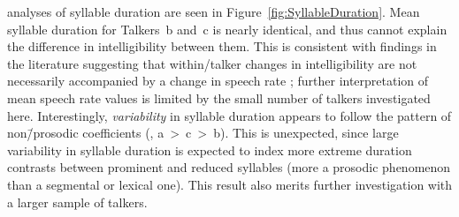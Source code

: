 \Ph{} analyses of syllable duration are seen in Figure~\ref{fig:SyllableDuration}.  Mean syllable duration for Talkers~\ac{b} and~\ac{c} is nearly identical, and thus cannot explain the difference in intelligibility between them.  This is consistent with findings in the literature suggesting that within\-/talker changes in intelligibility are not necessarily accompanied by a change in speech rate \citep{KrauseBraida2002}; further interpretation of mean speech rate values is limited by the small number of talkers investigated here.  Interestingly, \emph{variability} in syllable duration appears to follow the pattern of non\=/prosodic coefficients (\ie, \ac{a}~>~\ac{c}~>~\ac{b}).  This is unexpected, since large variability in syllable duration is expected to index more extreme duration contrasts between prominent and reduced syllables (more a prosodic phenomenon than a segmental or lexical one).  This result also merits further investigation with a larger sample of talkers.

